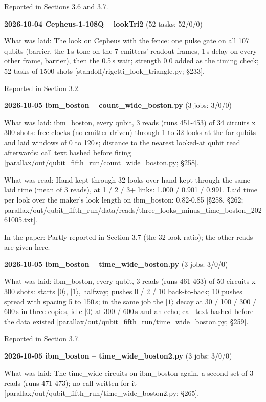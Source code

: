 \documentclass[11pt]{article}
\begin{document}
Reported in Sections 3.6 and 3.7.

\textbf{2026-10-04 Cepheus-1-108Q -- lookTri2} (52 tasks: 52/0/0)

What was laid: The look on Cepheus with the fence: one pulse gate on all 107 qubits (barrier, the 1\,\textmu s tone on the 7 emitters' readout frames, 1\,\textmu s delay on every other frame, barrier), then the 0.5\,\textmu s wait; strength 0.0 added as the timing check; 52 tasks of 1500 shots {[}standoff/rigetti\_look\_triangle.py; \S{}233{]}.

Reported in Section 3.2.

\textbf{2026-10-05 ibm\_boston -- count\_wide\_boston.py} (3 jobs: 3/0/0)

What was laid: ibm\_boston, every qubit, 3 reads (runs 451-453) of 34 circuits x 300 shots: free clocks (no emitter driven) through 1 to 32 looks at the far qubits and laid windows of 0 to 120\,\textmu s; distance to the nearest looked-at qubit read afterwards; call text hashed before firing {[}parallax/out/qubit\_fifth\_run/count\_wide\_boston.py; \S{}258{]}.

What was read: Hand kept through 32 looks over hand kept through the same laid time (mean of 3 reads), at 1 / 2 / 3+ links: 1.000 / 0.901 / 0.991. Laid time per look over the maker's look length on ibm\_boston: 0.82-0.85 {[}\S{}258, \S{}262; parallax/out/qubit\_fifth\_run/data/reads/three\_looks\_minus\_time\_boston\_20261005.txt{]}.

In the paper: Partly reported in Section 3.7 (the 32-look ratio); the other reads are given here.

\textbf{2026-10-05 ibm\_boston -- time\_wide\_boston.py} (3 jobs: 3/0/0)

What was laid: ibm\_boston, every qubit, 3 reads (runs 461-463) of 50 circuits x 300 shots: starts \(|0\rangle\), \(|1\rangle\), halfway; pushes 0 / 2 / 10 back-to-back; 10 pushes spread with spacing 5 to 150\,\textmu s; in the same job the \(|1\rangle\) decay at 30 / 100 / 300 / 600\,\textmu s in three copies, idle \(|0\rangle\) at 300 / 600\,\textmu s and an echo; call text hashed before the data existed {[}parallax/out/qubit\_fifth\_run/time\_wide\_boston.py; \S{}259{]}.

Reported in Section 3.7.

\textbf{2026-10-05 ibm\_boston -- time\_wide\_boston2.py} (3 jobs: 3/0/0)

What was laid: The time\_wide circuits on ibm\_boston again, a second set of 3 reads (runs 471-473); no call written for it {[}parallax/out/qubit\_fifth\_run/time\_wide\_boston2.py; \S{}265{]}.
\end{document}
